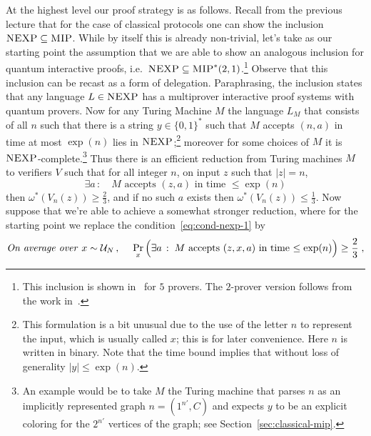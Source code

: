 At the highest level our proof strategy is as follows. Recall from the previous lecture that for the case of classical protocols one can show the inclusion $\textsc{NEXP} \subseteq \textsc{MIP}$. While by itself this is already non-trivial, let's take as our starting point the assumption that we are able to show an analogous inclusion for quantum interactive proofs, i.e.\ $\textsc{NEXP} \subseteq \textsc{MIP}^*(2,1)$.\footnote{This inclusion is shown in~\cite{ito2012multi} for $5$ provers. The $2$-prover version follows from the work in~\cite{ji2020quantum}.} Observe that this inclusion can be recast as a form of delegation. Paraphrasing, the inclusion states that any language $L\in \textsc{NEXP}$ has a multiprover interactive proof systems with quantum provers. Now for any Turing Machine $M$ the language $L_M $ that consists of all  $n$  such that there is a string $y\in\{0,1\}^*$ such that $M$ accepts $(n,a)$ in time at most $\exp(n)$ lies in $\textsc{NEXP}$;\footnote{This formulation is a bit unusual due to the use of the letter $n$ to represent the input, which is usually called $x$; this is for later convenience.  Here $n$ is written in binary. Note that the time bound implies that without loss of generality $|y|\leq \exp(n)$.} moreover for some choices of $M$ it is $\textsc{NEXP}$-complete.\footnote{An example would be to take $M$ the Turing machine that parses $n$ as an implicitly represented graph $n=(1^{n'},C)$ and expects $y$ to be an explicit coloring for the $2^{n'}$ vertices of the graph; see Section~\ref{sec:classical-mip}.} Thus there is an efficient reduction from Turing machines $M$ to verifiers $V$ such that for all integer $n$, on input $z$ such that $|z|=n$, 
\begin{equation}\label{eq:cond-nexp-1}
 \exists a\,:\quad\text{$M$ accepts $(z,a)$ in time $\leq \exp(n)$}
\end{equation}
 then $\omega^*(V_n(z))\geq \frac{2}{3}$, and if no such $a$ exists then $\omega^*(V_n(z))\leq \frac{1}{3}$. 
Now suppose that we're able to achieve a somewhat stronger reduction, where for the starting point we replace the condition~\eqref{eq:cond-nexp-1} by
\begin{equation}\label{eq:cond-nexp-2}
\text{\emph{On average over} } x\sim \mathcal{U}_N\,,\; \quad \Pr_x\Big( \exists a\,:\;M \text{ accepts $(z,x,a)$ in time $\leq \exp(n)$}\Big)\geq \frac{2}{3}\;,
\end{equation}
